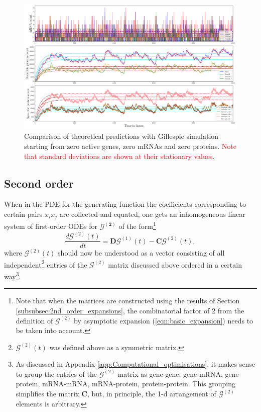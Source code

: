 \documentclass[a4paper, 11pt]{article}
\begin{document}
\begin{figure}
  \begin{center}
    \includegraphics[width=15cm]{img/protein_numbers.png}
  \end{center}  
  \caption{Comparison of theoretical predictions with Gillespie simulation starting from zero active genes, zero mRNAs and zero proteins. \textcolor{red}{Note that standard deviations are shown at their stationary values.}}
  \label{fig:Gillespie_simulation}
\end{figure}

\subsection{Second order}
When in the PDE for the generating function the coefficients corresponding to certain pairs $x_ix_j$ are collected and equated, one gets an inhomogeneous linear system of first-order ODEs for $\boldsymbol{\mathcal G^{(2)}}$ of the form\footnote{Note that when the matrices are constructed using the results of Section \ref{subsubsec:2nd_order_expansions}, the combinatorial factor of 2 from the definition of $\boldsymbol{\mathcal G}^{(2)}$ by asymptotic expansion (\ref{eqn:basic_expansion}) needs to be taken into account.}
\begin{equation}\label{o2_nonstat_ODE}
  \frac{d\boldsymbol{\mathcal G}^{(2)}(t)}{dt} = \mathbf D\boldsymbol{\mathcal G}^{(1)}(t) - \mathbf C\boldsymbol{\mathcal G}^{(2)}(t),
\end{equation}
where $\boldsymbol{\mathcal G}^{(2)}(t)$ should now be understood as a vector consisting of all independent\footnote{$\boldsymbol{\mathcal G}^{(2)}(t)$ was defined above as a symmetric matrix.} entries of the $\boldsymbol{\mathcal G}^{(2)}$ matrix discussed above ordered in a certain way\footnote{As discussed in Appendix \ref{app:Computational_optimisations}, it makes sense to group the entries of the $\boldsymbol{\mathcal G}^{(2)}$ matrix as gene-gene, gene-mRNA, gene-protein, mRNA-mRNA, mRNA-protein, protein-protein. This grouping simplifies the matrix $\mathbf C$, but, in principle, the 1-d arrangement of $\boldsymbol{\mathcal G}^{(2)}$ elements is arbitrary.}.
\end{document}
